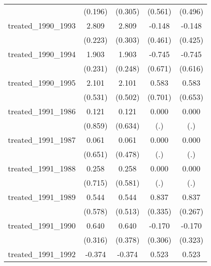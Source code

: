 {\begin{tabular}{l*{4}{c}}
            &     (0.196)         &     (0.305)         &     (0.561)         &     (0.496)         \\
[1em]
treated\_1990\_1993&       2.809\sym{***}&       2.809\sym{***}&      -0.148         &      -0.148         \\
            &     (0.223)         &     (0.303)         &     (0.461)         &     (0.425)         \\
[1em]
treated\_1990\_1994&       1.903\sym{***}&       1.903\sym{***}&      -0.745         &      -0.745         \\
            &     (0.231)         &     (0.248)         &     (0.671)         &     (0.616)         \\
[1em]
treated\_1990\_1995&       2.101\sym{***}&       2.101\sym{***}&       0.583         &       0.583         \\
            &     (0.531)         &     (0.502)         &     (0.701)         &     (0.653)         \\
[1em]
treated\_1991\_1986&       0.121         &       0.121         &       0.000         &       0.000         \\
            &     (0.859)         &     (0.634)         &         (.)         &         (.)         \\
[1em]
treated\_1991\_1987&       0.061         &       0.061         &       0.000         &       0.000         \\
            &     (0.651)         &     (0.478)         &         (.)         &         (.)         \\
[1em]
treated\_1991\_1988&       0.258         &       0.258         &       0.000         &       0.000         \\
            &     (0.715)         &     (0.581)         &         (.)         &         (.)         \\
[1em]
treated\_1991\_1989&       0.544         &       0.544         &       0.837\sym{*}  &       0.837\sym{**} \\
            &     (0.578)         &     (0.513)         &     (0.335)         &     (0.267)         \\
[1em]
treated\_1991\_1990&       0.640\sym{*}  &       0.640         &      -0.170         &      -0.170         \\
            &     (0.316)         &     (0.378)         &     (0.306)         &     (0.323)         \\
[1em]
treated\_1991\_1992&      -0.374         &      -0.374         &       0.523         &       0.523         \\

\end{tabular}}
